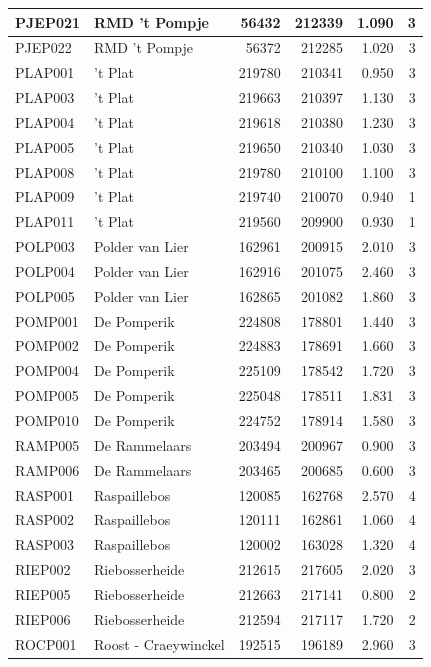 \documentclass[11pt,]{book}
\begin{document}
\begin{table}
\begin{tabular}[t]{l|l|r|r|r|r}
PJEP021 & RMD 't Pompje & 56432 & 212339 & 1.090 & 3\\
\hline
PJEP022 & RMD 't Pompje & 56372 & 212285 & 1.020 & 3\\
\hline
PLAP001 & 't Plat & 219780 & 210341 & 0.950 & 3\\
\hline
PLAP003 & 't Plat & 219663 & 210397 & 1.130 & 3\\
\hline
PLAP004 & 't Plat & 219618 & 210380 & 1.230 & 3\\
\hline
PLAP005 & 't Plat & 219650 & 210340 & 1.030 & 3\\
\hline
PLAP008 & 't Plat & 219780 & 210100 & 1.100 & 3\\
\hline
PLAP009 & 't Plat & 219740 & 210070 & 0.940 & 1\\
\hline
PLAP011 & 't Plat & 219560 & 209900 & 0.930 & 1\\
\hline
POLP003 & Polder van Lier & 162961 & 200915 & 2.010 & 3\\
\hline
POLP004 & Polder van Lier & 162916 & 201075 & 2.460 & 3\\
\hline
POLP005 & Polder van Lier & 162865 & 201082 & 1.860 & 3\\
\hline
POMP001 & De Pomperik & 224808 & 178801 & 1.440 & 3\\
\hline
POMP002 & De Pomperik & 224883 & 178691 & 1.660 & 3\\
\hline
POMP004 & De Pomperik & 225109 & 178542 & 1.720 & 3\\
\hline
POMP005 & De Pomperik & 225048 & 178511 & 1.831 & 3\\
\hline
POMP010 & De Pomperik & 224752 & 178914 & 1.580 & 3\\
\hline
RAMP005 & De Rammelaars & 203494 & 200967 & 0.900 & 3\\
\hline
RAMP006 & De Rammelaars & 203465 & 200685 & 0.600 & 3\\
\hline
RASP001 & Raspaillebos & 120085 & 162768 & 2.570 & 4\\
\hline
RASP002 & Raspaillebos & 120111 & 162861 & 1.060 & 4\\
\hline
RASP003 & Raspaillebos & 120002 & 163028 & 1.320 & 4\\
\hline
RIEP002 & Riebosserheide & 212615 & 217605 & 2.020 & 3\\
\hline
RIEP005 & Riebosserheide & 212663 & 217141 & 0.800 & 2\\
\hline
RIEP006 & Riebosserheide & 212594 & 217117 & 1.720 & 2\\
\hline
ROCP001 & Roost - Craeywinckel & 192515 & 196189 & 2.960 & 3\\

\end{tabular}
\end{table}
\end{document}
